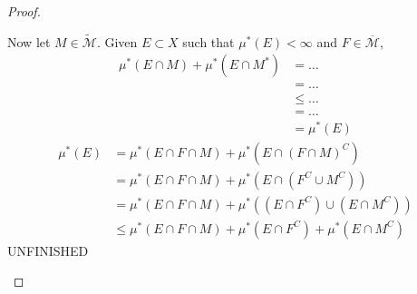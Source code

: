 \documentclass{article}
\theoremstyle{definition}
\begin{document}
\begin{proof}
\begin{enumerate}[label=\textbf{\alph*.}]
		      Now let $M \in \widetilde{\mathscr{M}}$.
		      Given $E \subset X$ such that $\mu^*(E) < \infty$ and $F \in \overline{\mathscr{M}}$, \begin{align*}
			      \mu^*(E \cap M) + \mu^*(E \cap M^*) & = \dots    \\
			                                          & = \dots    \\
			                                          & \leq \dots \\
			                                          & = \dots    \\
			                                          & = \mu^*(E)
		      \end{align*}
		      \begin{align*}
			      \mu^*(E) & = \mu^*(E \cap F \cap M) + \mu^*(E \cap (F \cap M)^C)               \\
			               & = \mu^*(E \cap F \cap M) + \mu^*(E \cap (F^C \cup M^C))             \\
			               & = \mu^*(E \cap F \cap M) + \mu^*((E \cap F^C) \cup (E \cap M^C))    \\
			               & \leq \mu^*(E \cap F \cap M) + \mu^*(E \cap F^C) + \mu^*(E \cap M^C)
		      \end{align*}
		      UNFINISHED
	\end{enumerate}
\end{proof}

\setcounter{ex}{24}
\end{document}

